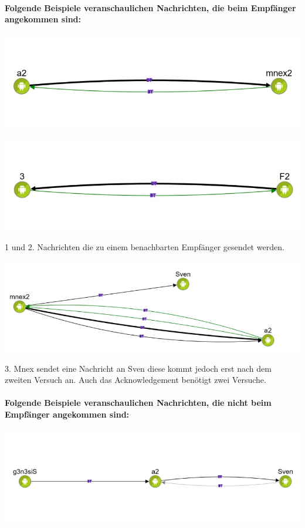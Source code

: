 \paragraph{Folgende Beispiele veranschaulichen Nachrichten, die beim Empfänger angekommen sind:}

\includegraphics[width=1.0\textwidth]{belege/grosstests/Bilder/Grosstest2/Test3Erfolg1.jpg}

\includegraphics[width=1.0\textwidth]{belege/grosstests/Bilder/Grosstest2/Test3Erfolg2.jpg}

1 und 2. Nachrichten die zu einem benachbarten Empfänger gesendet werden.

\includegraphics[width=1.0\textwidth]{belege/grosstests/Bilder/Grosstest2/Test3Erfolg3.jpg}

3. Mnex sendet eine Nachricht an Sven diese kommt jedoch erst nach dem
zweiten Versuch an. Auch das Acknowledgement benötigt zwei Versuche.

\paragraph{Folgende Beispiele veranschaulichen Nachrichten, die nicht beim Empfänger angekommen sind:}

\includegraphics[width=1.0\textwidth]{belege/grosstests/Bilder/Grosstest2/Test3Misserfolg1.jpg}


